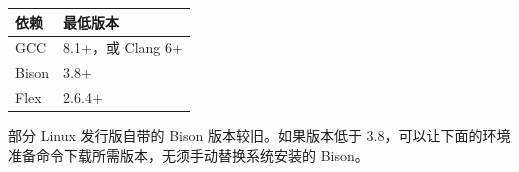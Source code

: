 \begin{table}[htbp]\centering\small
\begin{tabularx}{\linewidth}{@{}lX@{}}
\toprule
\textbf{依赖} & \textbf{最低版本} \\
\midrule
GCC & 8.1+，或 Clang 6+ \\
Bison & 3.8+ \\
Flex & 2.6.4+ \\
\bottomrule
\end{tabularx}
\end{table}

部分 Linux 发行版自带的 Bison 版本较旧。如果版本低于 3.8，可以让下面的环境准备命令下载所需版本，无须手动替换系统安装的 Bison。
